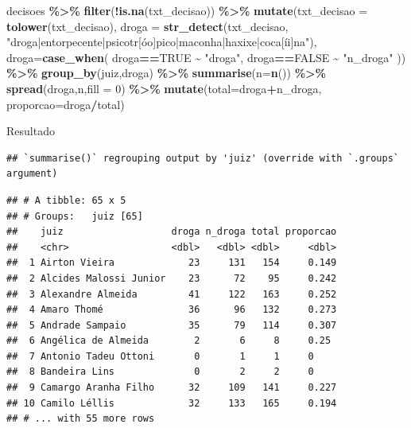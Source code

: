 \documentclass[
  10pt,
  ignorenonframetext,
]{beamer}
\newenvironment{Shaded}{\begin{snugshade}}{\end{snugshade}}
\newcommand{\DataTypeTok}[1]{\textcolor[rgb]{0.13,0.29,0.53}{#1}}
\newcommand{\DecValTok}[1]{\textcolor[rgb]{0.00,0.00,0.81}{#1}}
\newcommand{\KeywordTok}[1]{\textcolor[rgb]{0.13,0.29,0.53}{\textbf{#1}}}
\newcommand{\NormalTok}[1]{#1}
\newcommand{\OperatorTok}[1]{\textcolor[rgb]{0.81,0.36,0.00}{\textbf{#1}}}
\newcommand{\OtherTok}[1]{\textcolor[rgb]{0.56,0.35,0.01}{#1}}
\newcommand{\StringTok}[1]{\textcolor[rgb]{0.31,0.60,0.02}{#1}}
\begin{document}
\begin{frame}[fragile]{}
\protect\hypertarget{section-3}{}
\begin{Shaded}
\begin{Highlighting}[]
\NormalTok{decisoes }\OperatorTok{\%\textgreater{}\%}\StringTok{ }
\StringTok{  }\KeywordTok{filter}\NormalTok{(}\OperatorTok{!}\KeywordTok{is.na}\NormalTok{(txt\_decisao)) }\OperatorTok{\%\textgreater{}\%}
\StringTok{  }\KeywordTok{mutate}\NormalTok{(}\DataTypeTok{txt\_decisao =} \KeywordTok{tolower}\NormalTok{(txt\_decisao),}
         \DataTypeTok{droga =} \KeywordTok{str\_detect}\NormalTok{(txt\_decisao,}
    \StringTok{"droga|entorpecente|psicotr[óo]pico|maconha|haxixe|coca[íi]na"}\NormalTok{),}
    \DataTypeTok{droga=}\KeywordTok{case\_when}\NormalTok{(}
\NormalTok{      droga}\OperatorTok{==}\OtherTok{TRUE} \OperatorTok{\textasciitilde{}}\StringTok{ "droga"}\NormalTok{,}
\NormalTok{      droga}\OperatorTok{==}\OtherTok{FALSE} \OperatorTok{\textasciitilde{}}\StringTok{ "n\_droga"}
\NormalTok{    )) }\OperatorTok{\%\textgreater{}\%}
\StringTok{  }\KeywordTok{group\_by}\NormalTok{(juiz,droga) }\OperatorTok{\%\textgreater{}\%}
\StringTok{  }\KeywordTok{summarise}\NormalTok{(}\DataTypeTok{n=}\KeywordTok{n}\NormalTok{()) }\OperatorTok{\%\textgreater{}\%}
\StringTok{  }\KeywordTok{spread}\NormalTok{(droga,n,}\DataTypeTok{fill =} \DecValTok{0}\NormalTok{) }\OperatorTok{\%\textgreater{}\%}
\StringTok{  }\KeywordTok{mutate}\NormalTok{(}\DataTypeTok{total=}\NormalTok{droga}\OperatorTok{+}\NormalTok{n\_droga,}
         \DataTypeTok{proporcao=}\NormalTok{droga}\OperatorTok{/}\NormalTok{total)}
\end{Highlighting}
\end{Shaded}
\end{frame}

\begin{frame}[fragile]{Resultado}
\protect\hypertarget{resultado}{}
\begin{verbatim}
## `summarise()` regrouping output by 'juiz' (override with `.groups` argument)
\end{verbatim}

\begin{verbatim}
## # A tibble: 65 x 5
## # Groups:   juiz [65]
##    juiz                   droga n_droga total proporcao
##    <chr>                  <dbl>   <dbl> <dbl>     <dbl>
##  1 Airton Vieira             23     131   154     0.149
##  2 Alcides Malossi Junior    23      72    95     0.242
##  3 Alexandre Almeida         41     122   163     0.252
##  4 Amaro Thomé               36      96   132     0.273
##  5 Andrade Sampaio           35      79   114     0.307
##  6 Angélica de Almeida        2       6     8     0.25 
##  7 Antonio Tadeu Ottoni       0       1     1     0    
##  8 Bandeira Lins              0       2     2     0    
##  9 Camargo Aranha Filho      32     109   141     0.227
## 10 Camilo Léllis             32     133   165     0.194
## # ... with 55 more rows
\end{verbatim}
\end{frame}
\end{document}
